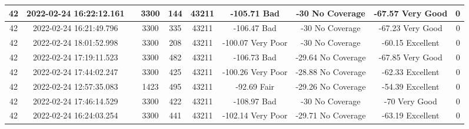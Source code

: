 \begin{longtable*}{|c|c|c|c|c|c|c|c|c|c|}
42&2022-02-24 16:22:12.161&&3300&144&43211& -105.71   Bad         & -30       No Coverage & -67.57    Very Good   & 0\\\hline
{}42&2022-02-24 16:21:49.796&&3300&335&43211& -106.47   Bad         & -30       No Coverage & -67.23    Very Good   & 0\\\hline
{}42&2022-02-24 18:01:52.998&&3300&208&43211& -100.07   Very Poor   & -30       No Coverage & -60.15    Excellent   & 0\\\hline
{}42&2022-02-24 17:19:11.523&&3300&482&43211& -106.73   Bad         & -29.64    No Coverage & -67.85    Very Good   & 0\\\hline
{}42&2022-02-24 17:44:02.247&&3300&425&43211& -100.26   Very Poor   & -28.88    No Coverage & -62.33    Excellent   & 0\\\hline
{}42&2022-02-24 12:57:35.083&&1423&495&43211& -92.69    Fair        & -29.26    No Coverage & -54.39    Excellent   & 0\\\hline
{}42&2022-02-24 17:46:14.529&&3300&422&43211& -108.97   Bad         & -30       No Coverage & -70       Very Good   & 0\\\hline
{}42&2022-02-24 16:24:03.254&&3300&441&43211& -102.14   Very Poor   & -29.71    No Coverage & -63.19    Excellent   & 0\\\hline

\end{longtable*}
